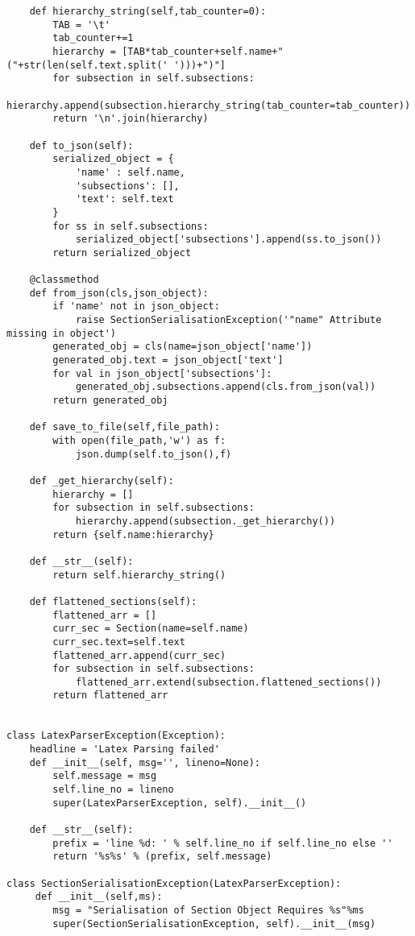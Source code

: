 \begin{lstlisting}
    def hierarchy_string(self,tab_counter=0):
        TAB = '\t'
        tab_counter+=1
        hierarchy = [TAB*tab_counter+self.name+"("+str(len(self.text.split(' ')))+")"]
        for subsection in self.subsections:
            hierarchy.append(subsection.hierarchy_string(tab_counter=tab_counter))
        return '\n'.join(hierarchy)
    
    def to_json(self):
        serialized_object = {
            'name' : self.name,
            'subsections': [],
            'text': self.text
        }
        for ss in self.subsections:
            serialized_object['subsections'].append(ss.to_json())
        return serialized_object

    @classmethod
    def from_json(cls,json_object):
        if 'name' not in json_object:
            raise SectionSerialisationException('"name" Attribute missing in object')
        generated_obj = cls(name=json_object['name'])
        generated_obj.text = json_object['text']
        for val in json_object['subsections']:
            generated_obj.subsections.append(cls.from_json(val))
        return generated_obj
    
    def save_to_file(self,file_path):
        with open(file_path,'w') as f:
            json.dump(self.to_json(),f)

    def _get_hierarchy(self):
        hierarchy = []
        for subsection in self.subsections:
            hierarchy.append(subsection._get_hierarchy())
        return {self.name:hierarchy}
        
    def __str__(self):
        return self.hierarchy_string()
    
    def flattened_sections(self):
        flattened_arr = []
        curr_sec = Section(name=self.name)
        curr_sec.text=self.text
        flattened_arr.append(curr_sec)
        for subsection in self.subsections:
            flattened_arr.extend(subsection.flattened_sections())
        return flattened_arr


class LatexParserException(Exception):
    headline = 'Latex Parsing failed'
    def __init__(self, msg='', lineno=None):
        self.message = msg
        self.line_no = lineno
        super(LatexParserException, self).__init__()

    def __str__(self):
        prefix = 'line %d: ' % self.line_no if self.line_no else ''
        return '%s%s' % (prefix, self.message)

class SectionSerialisationException(LatexParserException):
     def __init__(self,ms):
        msg = "Serialisation of Section Object Requires %s"%ms
        super(SectionSerialisationException, self).__init__(msg)


\end{lstlisting}
